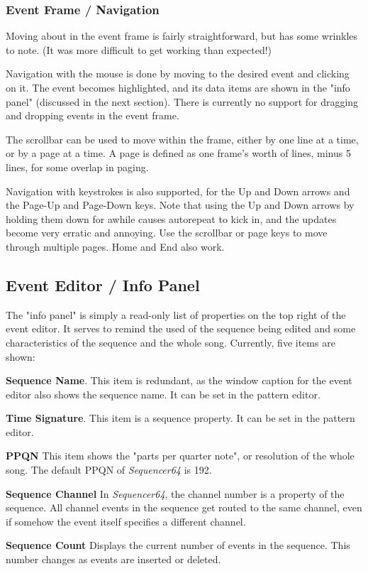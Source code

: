 \subsubsection{Event Frame / Navigation}
\label{subsec:seq64_event_frame_navigation}

   Moving about in the event frame is fairly straightforward, but has some
   wrinkles to note.  (It was more difficult to get working than expected!)

   Navigation with the mouse is done by moving to the desired event and
   clicking on it.  The event becomes highlighted, and its data items are shown
   in the "info panel" (discussed in the next section).
   There is currently no support for dragging and dropping events in the event
   frame.

   The scrollbar can be used to move within the frame, either by one line at a
   time, or by a page at a time.  A page is defined as one frame's worth of
   lines, minus 5 lines, for some overlap in paging.

   Navigation with keystrokes is also supported, for the Up and Down arrows and
   the Page-Up and Page-Down keys.  Note that using the Up and Down arrows by
   holding them down for awhile causes autorepeat to kick in, and the updates
   become very erratic and annoying.  Use the scrollbar or page keys to
   move through multiple pages.  Home and End also work.

\subsection{Event Editor / Info Panel}
\label{subsec:seq64_event_editor_info}

   The "info panel" is simply a read-only list of properties on the top right
   of the event editor.  It serves to remind the used of the sequence being
   edited and some characteristics of the sequence and the whole song.
   Currently, five items are shown:

   \begin{enumber}
      \item \textbf{Sequence Name}.
         This item is redundant, as the window caption for the event editor
         also shows the sequence name.  It can be set in the pattern editor.
      \item \textbf{Time Signature}.
         This item is a sequence property.  It can be set in the pattern
         editor.
      \item \textbf{PPQN}
         This item shows the "parts per quarter note", or resolution of the
         whole song.  The default PPQN of \textsl{Sequencer64} is 192.
      \item \textbf{Sequence Channel}
         In \textsl{Sequencer64}, the channel number is a property of the
         sequence.  All channel events in the sequence get routed to the same
         channel, even if somehow the event itself specifies a different
         channel.
      \item \textbf{Sequence Count}
         Displays the current number of events in the sequence.
         This number changes as events are inserted or deleted.
   \end{enumber}


